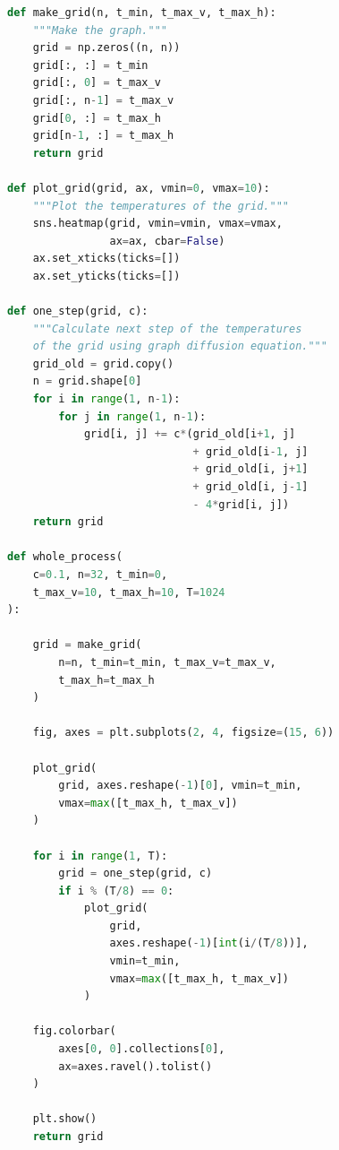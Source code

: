 \documentclass{article}
\begin{document}
        \begin{lstlisting}[language=Python]
def make_grid(n, t_min, t_max_v, t_max_h):
    """Make the graph."""
    grid = np.zeros((n, n))
    grid[:, :] = t_min
    grid[:, 0] = t_max_v
    grid[:, n-1] = t_max_v
    grid[0, :] = t_max_h
    grid[n-1, :] = t_max_h
    return grid

def plot_grid(grid, ax, vmin=0, vmax=10):
    """Plot the temperatures of the grid."""
    sns.heatmap(grid, vmin=vmin, vmax=vmax,
                ax=ax, cbar=False)
    ax.set_xticks(ticks=[])
    ax.set_yticks(ticks=[])

def one_step(grid, c):
    """Calculate next step of the temperatures
    of the grid using graph diffusion equation."""
    grid_old = grid.copy()
    n = grid.shape[0]
    for i in range(1, n-1):
        for j in range(1, n-1):
            grid[i, j] += c*(grid_old[i+1, j]
                             + grid_old[i-1, j]
                             + grid_old[i, j+1]
                             + grid_old[i, j-1]
                             - 4*grid[i, j])
    return grid

def whole_process(
    c=0.1, n=32, t_min=0,
    t_max_v=10, t_max_h=10, T=1024
):
    
    grid = make_grid(
        n=n, t_min=t_min, t_max_v=t_max_v,
        t_max_h=t_max_h
    )
    
    fig, axes = plt.subplots(2, 4, figsize=(15, 6))
    
    plot_grid(
        grid, axes.reshape(-1)[0], vmin=t_min,
        vmax=max([t_max_h, t_max_v])
    )
    
    for i in range(1, T):
        grid = one_step(grid, c)
        if i % (T/8) == 0:
            plot_grid(
                grid,
                axes.reshape(-1)[int(i/(T/8))],
                vmin=t_min,
                vmax=max([t_max_h, t_max_v])
            )
            
    fig.colorbar(
        axes[0, 0].collections[0],
        ax=axes.ravel().tolist()
    )
    
    plt.show()
    return grid
        \end{lstlisting}
\end{document}
